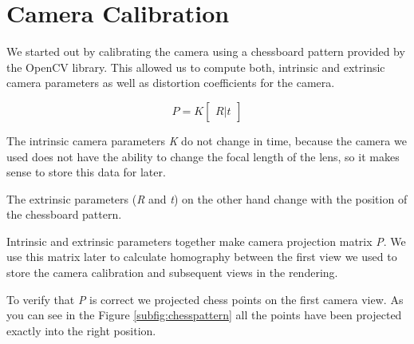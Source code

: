 \section{Camera Calibration}
We started out by calibrating the camera using a chessboard pattern provided by the OpenCV library. This allowed us to compute both, intrinsic and extrinsic camera parameters as well as distortion coefficients for the camera. 

\begin{equation}
	P = K \begin{bmatrix} R|t \end{bmatrix}
\end{equation}

The intrinsic camera parameters \textit{K} do not change in time, because the camera we used does not have the ability to change the focal length of the lens, so it makes sense to store this data for later. 

The extrinsic parameters (\textit{R} and \textit{t}) on the other hand change with the position of the chessboard pattern.

Intrinsic and extrinsic parameters together make camera projection matrix \textit{P}. We use this matrix later to calculate homography between the first view we used to store the camera calibration and subsequent views in the rendering.

To verify that \textit{P} is correct we projected chess points on the first camera view. As you can see in the Figure \ref{subfig:chesspattern} all the points have been projected exactly into the right position.
 
